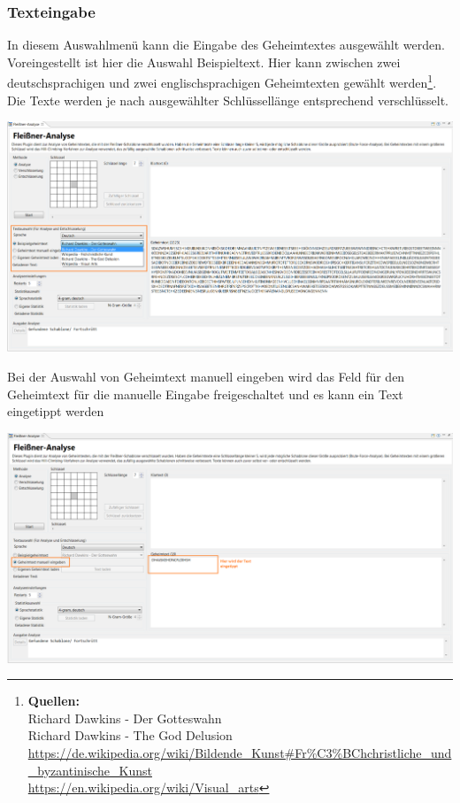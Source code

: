\documentclass[fontsize=12pt, DIV=15, parskip=half-]{scrartcl}
\theoremstyle{break}
\begin{document}
\subsubsection{Texteingabe}\hypertarget{txteing}{}
In diesem Auswahlmenü kann die Eingabe des Geheimtextes ausgewählt werden. Voreingestellt ist hier die Auswahl \glqq Beispieltext\grqq. Hier kann zwischen zwei deutschsprachigen und zwei englischsprachigen
Geheimtexten gewählt werden\footnote{\textbf{Quellen:}\\ Richard Dawkins - Der Gotteswahn\\ Richard Dawkins - The God Delusion\\ \url{https://de.wikipedia.org/wiki/Bildende_Kunst\#Fr\%C3\%BChchristliche_und_byzantinische_Kunst}\\ \url{https://en.wikipedia.org/wiki/Visual_arts}}. Die Texte werden je nach ausgewählter Schlüssellänge entsprechend verschlüsselt. 

\includegraphics[scale=0.45]{FleissnerTxtAuswahl.png}

Bei der Auswahl von \glqq Geheimtext manuell eingeben\grqq{} wird das Feld für den Geheimtext für die manuelle Eingabe freigeschaltet und es kann ein Text eingetippt werden

\includegraphics[scale=0.45]{FleissnerManGhtxt.png}
\end{document}
